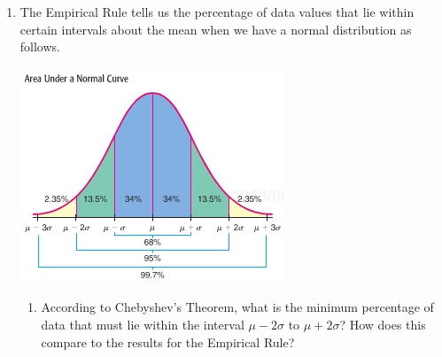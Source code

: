 \documentclass{article}
\newcommand{\answer}[1]{\color{white}#1}
\begin{document}
\begin{enumerate}
\begin{enumerate}
	{\answer Since $\mu = 21$, the percentage of the eggs that will hatch at that time or greater is 50\%.  So, that is 500 of the eggs.}
	
	\item between 20 and 21 days? 
	
	{\answer Since $\mu = 21$ and $\sigma =1$, we are looking at the percentage of the eggs in the interval $\mu-\sigma$ to $\mu$ which is 34\%.  So, that is 340 of the eggs.}
	
	\item between 22 and 23 days?
	
	{\answer Since $\mu = 21$ and $\sigma=1$, we are looking at the percentage of eggs in the interval $\mu+\sigma$ and $\mu + 2\sigma$ which is 13.5\%.  So, that is 135 of the eggs.}
	
	\item between 19 and 22 days?
	
	{\answer Since $\mu = 21$ and $\sigma=1$, we are looking at the percentage of eggs in the interval $\mu-2\sigma$ and $\mu + \sigma$ which is 81.5\%.  So, that is 815 of the eggs.}
	
	\end{enumerate}

\newpage

\item The Empirical Rule tells us the percentage of data values that lie within certain intervals about the mean when we have a normal distribution as follows.

\begin{center}
\includegraphics[scale=0.5]{WS10_NormalArea.jpg}
\end{center}

	\begin{enumerate}
	\item According to Chebyshev's Theorem, what is the minimum percentage of data that must lie within the interval $\mu-2\sigma$ to $\mu + 2\sigma$?  How does this compare to the results for the Empirical Rule?
	

\end{enumerate}
\end{enumerate}
\end{document}
